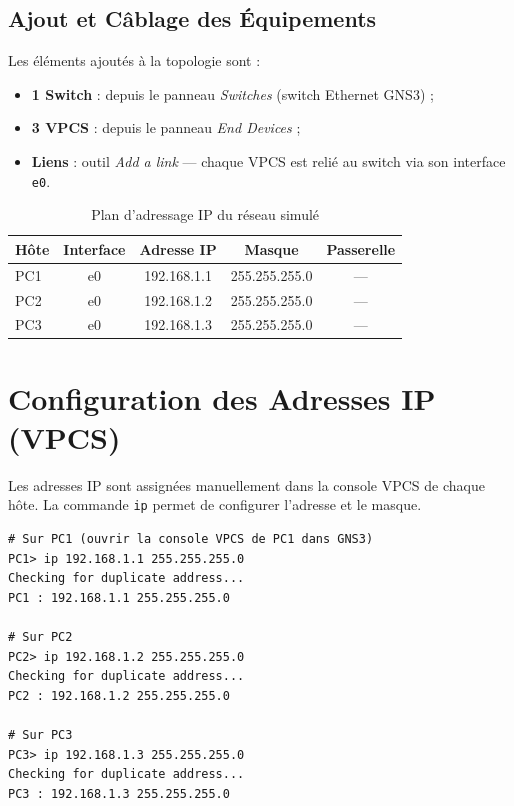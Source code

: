 \documentclass[11pt,a4paper,oneside]{report}
\begin{document}
\subsection{Ajout et C\^{a}blage des \'{E}quipements}

Les \'{e}l\'{e}ments ajout\'{e}s \`{a} la topologie sont :

\begin{itemize}[leftmargin=*, itemsep=2pt]
  \item \textbf{1 Switch} : depuis le panneau \textit{Switches} (switch Ethernet GNS3) ;
  \item \textbf{3 VPCS} : depuis le panneau \textit{End Devices} ;
  \item \textbf{Liens} : outil \textit{Add a link} --- chaque VPCS est reli\'{e} au switch
        via son interface \texttt{e0}.
\end{itemize}

\begin{table}[H]
\centering\small
\caption{Plan d'adressage IP du r\'{e}seau simul\'{e}}
\label{tab:adressage}
\begin{tabular}{|l|c|c|c|c|}
\hline
\rowcolor{univblue}
\color{white}\textbf{H\^{o}te} &
\color{white}\textbf{Interface} &
\color{white}\textbf{Adresse IP} &
\color{white}\textbf{Masque} &
\color{white}\textbf{Passerelle} \\ \hline
PC1 & e0 & 192.168.1.1 & 255.255.255.0 & --- \\ \hline
\rowcolor{rowgray}
PC2 & e0 & 192.168.1.2 & 255.255.255.0 & --- \\ \hline
PC3 & e0 & 192.168.1.3 & 255.255.255.0 & --- \\ \hline
\end{tabular}
\end{table}

\section{Configuration des Adresses IP (VPCS)}

Les adresses IP sont assign\'{e}es manuellement dans la console VPCS de chaque h\^{o}te.
La commande \texttt{ip} permet de configurer l'adresse et le masque.

\begin{tcolorbox}[consolebox]
\begin{lstlisting}[style=console]
# Sur PC1 (ouvrir la console VPCS de PC1 dans GNS3)
PC1> ip 192.168.1.1 255.255.255.0
Checking for duplicate address...
PC1 : 192.168.1.1 255.255.255.0

# Sur PC2
PC2> ip 192.168.1.2 255.255.255.0
Checking for duplicate address...
PC2 : 192.168.1.2 255.255.255.0

# Sur PC3
PC3> ip 192.168.1.3 255.255.255.0
Checking for duplicate address...
PC3 : 192.168.1.3 255.255.255.0
\end{lstlisting}
\end{tcolorbox}
\end{document}
